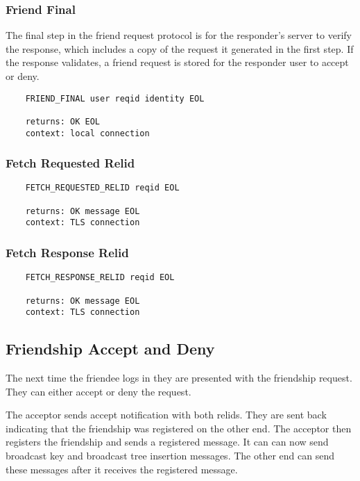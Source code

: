 \documentclass[letterpaper,11pt,oneside]{article}
\begin{document}
\subsubsection{Friend Final}

The final step in the friend request protocol is for the responder's server to
verify the response, which includes a copy of the request it generated in the
first step. If the response validates, a friend request is stored for the
responder user to accept or deny.

\vspace{10pt}
\begin{verbatim}
    FRIEND_FINAL user reqid identity EOL

    returns: OK EOL
    context: local connection
\end{verbatim}
\vspace{10pt}

\subsubsection{Fetch Requested Relid}

\vspace{10pt}
\begin{verbatim}
    FETCH_REQUESTED_RELID reqid EOL

    returns: OK message EOL
    context: TLS connection
\end{verbatim}
\vspace{10pt}

\subsubsection{Fetch Response Relid}

\vspace{10pt}
\begin{verbatim}
    FETCH_RESPONSE_RELID reqid EOL

    returns: OK message EOL
    context: TLS connection
\end{verbatim}

\subsection{Friendship Accept and Deny}

The next time the friendee logs in they are presented with the friendship
request. They can either accept or deny the request. 

The acceptor sends accept notification with both relids. They are sent back
indicating that the friendship was registered on the other end. The acceptor
then registers the friendship and sends a registered message. It can can now
send broadcast key and broadcast tree insertion messages. The other end can
send these messages after it receives the registered message.
\end{document}
